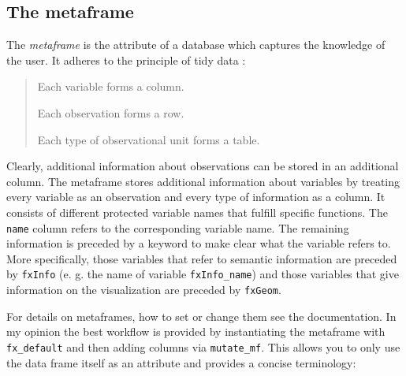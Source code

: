 \documentclass[]{report}
\newenvironment{Shaded}{\begin{snugshade}}{\end{snugshade}}
\newcommand{\KeywordTok}[1]{\textcolor[rgb]{0.13,0.29,0.53}{\textbf{#1}}}
\newcommand{\DataTypeTok}[1]{\textcolor[rgb]{0.13,0.29,0.53}{#1}}
\newcommand{\DecValTok}[1]{\textcolor[rgb]{0.00,0.00,0.81}{#1}}
\newcommand{\StringTok}[1]{\textcolor[rgb]{0.31,0.60,0.02}{#1}}
\newcommand{\OperatorTok}[1]{\textcolor[rgb]{0.81,0.36,0.00}{\textbf{#1}}}
\newcommand{\NormalTok}[1]{#1}
\theoremstyle{definition}
\theoremstyle{definition}
\theoremstyle{definition}
\theoremstyle{remark}
\begin{document}
\subsection{The metaframe}\label{the-metaframe}

The \emph{metaframe} is the attribute of a database which captures the
knowledge of the user. It adheres to the principle of tidy data
\citep{Wickham2014}:

\begin{quote}
Each variable forms a column.

Each observation forms a row.

Each type of observational unit forms a table.
\end{quote}

Clearly, additional information about observations can be stored in an
additional column. The metaframe stores additional information about
variables by treating every variable as an observation and every type of
information as a column. It consists of different protected variable
names that fulfill specific functions. The \texttt{name} column refers
to the corresponding variable name. The remaining information is
preceded by a keyword to make clear what the variable refers to. More
specifically, those variables that refer to semantic information are
preceded by \texttt{fxInfo} (e. g. the name of variable
\texttt{fxInfo\_name}) and those variables that give information on the
visualization are preceded by \texttt{fxGeom}.

For details on metaframes, how to set or change them see the
documentation. In my opinion the best workflow is provided by
instantiating the metaframe with \texttt{fx\_default} and then adding
columns via \texttt{mutate\_mf}. This allows you to only use the data
frame itself as an attribute and provides a concise terminology:

\begin{Shaded}
\end{Shaded}
\end{document}
